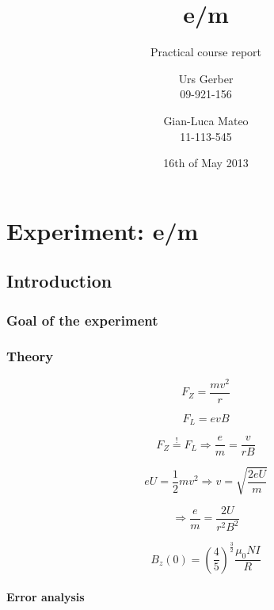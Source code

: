 \documentclass{scrreprt}
\author{Urs Gerber\\09-921-156 \and Gian-Luca Mateo\\11-113-545}
\date{16th of May 2013}
\title{e/m}
\subtitle{Practical course report}
\begin{document}
\maketitle

\tableofcontents
\newpage

\chapter{Experiment: e/m}

\section{Introduction}

\subsection{Goal of the experiment}
 
\subsection{Theory}

\begin{equation}
F_Z = \frac{m v^2}{r}
\end{equation}

\begin{equation}
F_L = e v B
\end{equation}

\begin{equation}
F_Z \stackrel{!}{=} F_L \Longrightarrow \frac{e}{m} = \frac{v}{r B}
\end{equation}

\begin{equation}
e U = \frac{1}{2} m v^2 \Longrightarrow v = \sqrt{\frac{2 e U}{m}}
\end{equation}

\begin{equation}
\Longrightarrow \frac{e}{m} = \frac{2 U}{r^2 B^2}
\end{equation}

\begin{equation}
B_z (0) = \left( \frac{4}{5}\right)^{\frac{3}{2}} \frac{\mu_0 N I}{R}
\end{equation}

\subsubsection{Error analysis}
\end{document}
